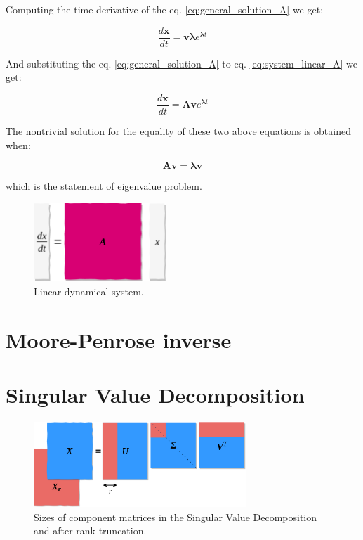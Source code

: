 \documentclass[10pt,twocolumn]{article}
\begin{document}
Computing the time derivative of the eq. \ref{eq:general_solution_A} we get:

\begin{equation} \label{eq:sub1}
\frac{d \mathbf{x}}{dt} = \mathbf{v} \mathbf{\lambda} e^{\mathbf{\lambda} t}
\end{equation}

And substituting the eq. \ref{eq:general_solution_A} to eq. \ref{eq:system_linear_A} we get:

\begin{equation} \label{eq:sub2}
\frac{d \mathbf{x}}{dt} = \mathbf{A} \mathbf{v} e^{\mathbf{\lambda} t}
\end{equation}

The nontrivial solution for the equality of these two above equations is obtained when:

\begin{equation} \label{eq:eigval}
\mathbf{A} \mathbf{v} = \mathbf{\lambda} \mathbf{v} 
\end{equation}

which is the statement of eigenvalue problem.



\begin{figure}[H]
\centering\includegraphics[width=5cm]{lin-dyn.png}
\caption{Linear dynamical system.}
\label{fig:linear_system}
\end{figure}










\section{Moore-Penrose inverse} \label{app:B}




\section{Singular Value Decomposition} \label{app:C}


\begin{figure}[H]
\centering\includegraphics[width=8cm]{svd.png}
\caption{Sizes of component matrices in the Singular Value Decomposition and after rank truncation.}
\label{fig:linear_system}
\end{figure}
\end{document}
